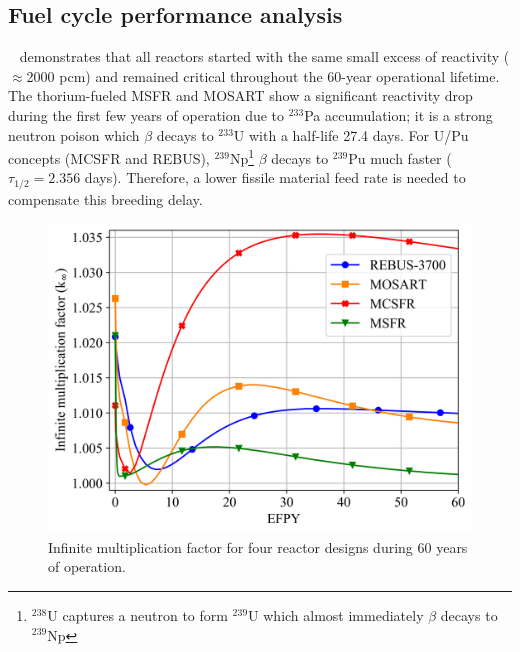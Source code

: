 \documentclass{anstrans}
\begin{document}
\subsection{Fuel cycle performance analysis} 
\label{sec:performance}
~ demonstrates that all reactors started with the same small excess of reactivity ($\approx$2000 pcm) and remained critical throughout the 60-year operational lifetime. The thorium-fueled \gls{MSFR} and \gls{MOSART} show a significant reactivity drop during the first few years of operation due to $^{233}$Pa accumulation; it is a strong neutron poison which $\beta$ decays to $^{233}$U with a half-life 27.4 days. For U/Pu concepts (\gls{MCSFR} and REBUS), $^{239}$Np\footnote{$^{238}$U captures a neutron to form $^{239}$U which almost immediately $\beta$ decays to $^{239}$Np} $\beta$ decays to $^{239}$Pu much faster ($\tau_{1/2}=2.356$ days). Therefore, a lower fissile material feed rate is needed to compensate this breeding delay.
\begin{figure}[!htb]
  \centering
  \includegraphics[scale=0.585]{./Figures/k_inf.png}
  \vspace{-0.25in}
  \caption{Infinite multiplication factor for four reactor designs during 60 years of operation.}   
  \label{fig:k_inf}
\end{figure}
\end{document}
